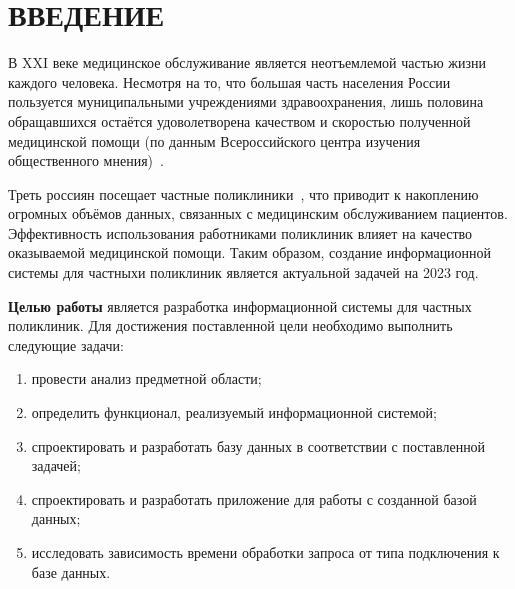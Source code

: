 \section*{\large ВВЕДЕНИЕ}

В XXI веке медицинское обслуживание является неотъемлемой частью жизни каждого человека. Несмотря на то, что большая часть населения России пользуется муниципальными учреждениями здравоохранения, лишь половина обращавшихся остаётся удоволетворена качеством и скоростью полученной медицинской помощи (по данным Всероссийского центра изучения общественного мнения)~\cite{wciom}.

Треть россиян посещает частные поликлиники~\cite{wciom}, что приводит к накоплению огромных объёмов данных, связанных с медицинским обслуживанием пациентов. 
Эффективность использования работниками поликлиник влияет на качество оказываемой медицинской помощи. 
Таким образом, создание информационной системы для частныхи поликлиник является актуальной задачей на 2023 год.


\textbf{Целью работы} является разработка информационной системы для частных поликлиник.
Для достижения поставленной цели необходимо выполнить следующие задачи:
\begin{enumerate}[label=\arabic*)]
	\item провести анализ предметной области;
	\item определить функционал, реализуемый информационной системой;
	\item спроектировать и разработать базу данных в соответствии с поставленной задачей;
	\item спроектировать и разработать приложение для работы с созданной базой данных;
	\item исследовать зависимость времени обработки запроса от типа подключения к базе данных.
\end{enumerate}

